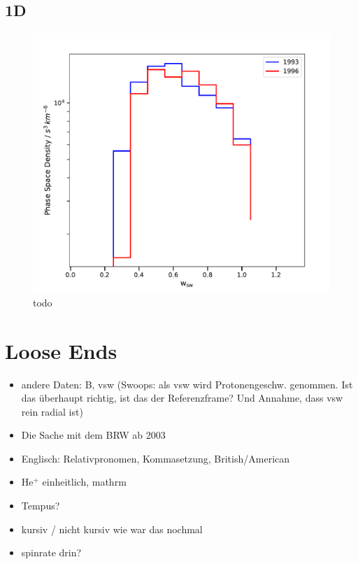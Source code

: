 \subsection{1D}

\begin{figure}[h]
	\includegraphics[width=.8\textwidth]{Figures/1D.pdf}
	\centering
	\caption{todo}
	\label{fig:todo}
\end{figure}
%
%
%
\clearpage
\section{Loose Ends}
\begin{itemize}
	\item andere Daten: B, vsw (Swoops: als vsw wird Protonengeschw. genommen. Ist das überhaupt richtig, ist das der Referenzframe? Und Annahme, dass vsw rein radial ist)
	\item Die Sache mit dem BRW ab 2003
	\item Englisch: Relativpronomen, Kommasetzung, British/American
	\item $\mathrm{He^{+}}$ einheitlich, mathrm
	\item Tempus?
	\item kursiv / nicht kursiv wie war das nochmal
	\item spinrate drin?
\end{itemize}
